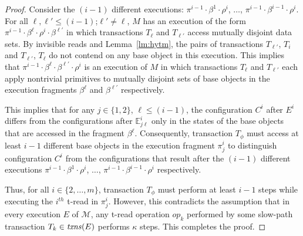 \begin{proof}
Consider the $(i-1)$ different executions: 
$\pi^{i-1}\cdot\beta^{1}\cdot \rho^i$, $\ldots$, $\pi^{i-1}\cdot\beta^{i-1}\cdot \rho^i$.
For all $\ell, \ell' \leq (i-1)$;$\ell' \neq \ell$, 
$M$ has an execution of the form $\pi^{i-1}\cdot \beta^{\ell}\cdot \rho^i \cdot \beta^{\ell'}$
in which transactions $T_{\ell}$ and $T_{\ell'}$ access mutually disjoint data sets.
By invisible reads and Lemma~\ref{lm:hytm}, the pairs of transactions $T_{\ell'}$, $T_{i}$ and $T_{\ell'}$, $T_{\ell}$
do not contend on any base object in this execution.
This implies that $\pi^{i-1}\cdot \beta^{\ell} \cdot \beta^{\ell'} \cdot \rho^i$ is an execution of $M$ in which
transactions $T_{\ell}$ and $T_{\ell'}$ each apply nontrivial primitives
to mutually disjoint sets of base objects in the execution fragments $\beta^{\ell}$ and $\beta^{\ell'}$ respectively.

This implies that for any $j\in \{1,2\}$, $\ell \leq (i-1)$, the configuration $C^i$ after $E^i$ differs from the configurations
after $\mathbb{E}_{j\ell}^{i}$ only in the states of the base objects that are accessed in the fragment $\beta^{\ell}$.
Consequently, transaction $T_{\phi}$ must access at least $i-1$ different base objects
in the execution fragment $\pi_j^i$
to distinguish configuration $C^i$ from the configurations
that result after the $(i-1)$ different executions 
$\pi^{i-1}\cdot\beta^{1}\cdot \rho^i$, $\ldots$, $\pi^{i-1}\cdot\beta^{i-1}\cdot \rho^i$ respectively.

Thus, for all $i \in \{2,\ldots, m\}$, transaction $T_{\phi}$ must perform at least $i-1$ steps 
while executing the $i^{th}$ t-read in $\pi_{j}^i$.
However, this contradicts the assumption that in every execution $E$ of $\mathcal{M}$, any t-read operation $op_k$ performed by some slow-path transaction $T_k \in \ms{txns}(E)$
performs $\kappa$ steps. This completes the proof.
\end{proof}

